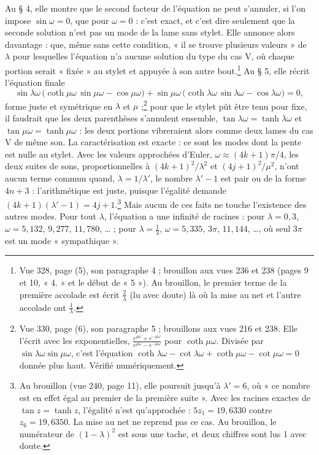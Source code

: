 \documentclass[11pt,a4paper]{article}
\begin{document}
Au § 4, elle montre que le second facteur de l'équation ne peut s'annuler, si l'on impose $\sin\omega=0$, que pour $\omega=0$ : c'est exact, et c'est dire seulement que la seconde solution n'est pas un mode de la lame sans stylet. Elle annonce alors davantage : que, même sans cette condition, « il se trouve plusieurs valeurs » de $\lambda$ pour lesquelles l'équation n'a aucune solution du type du cas V, où chaque portion serait « fixée » au stylet et appuyée à son autre bout.\footnote{Vue 328, page (5), son paragraphe 4 ; brouillon aux vues 236 et 238 (pages 9 et 10, « 4. » et le début de « 5 »). Au brouillon, le premier terme de la première accolade est écrit $\frac2\lambda$ (lu avec doute) là où la mise au net et l'autre accolade ont $\frac1\lambda$.} Au § 5, elle récrit l'équation finale
\[
\sin\lambda\omega\,\bigl(\coth\mu\omega\,\sin\mu\omega-\cos\mu\omega\bigr)+\sin\mu\omega\,\bigl(\coth\lambda\omega\,\sin\lambda\omega-\cos\lambda\omega\bigr)=0,
\]
forme juste et symétrique en $\lambda$ et $\mu$ ;\footnote{Vue 330, page (6), son paragraphe 5 ; brouillons aux vues 216 et 238. Elle l'écrit avec les exponentielles, $\frac{e^{\mu\omega}+e^{-\mu\omega}}{e^{\mu\omega}-e^{-\mu\omega}}$ pour $\coth\mu\omega$. Divisée par $\sin\lambda\omega\sin\mu\omega$, c'est l'équation $\coth\lambda\omega-\cot\lambda\omega+\coth\mu\omega-\cot\mu\omega=0$ donnée plus haut. Vérifié numériquement.} pour que le stylet pût être tenu pour fixe, il faudrait que les deux parenthèses s'annulent ensemble, $\tan\lambda\omega=\tanh\lambda\omega$ et $\tan\mu\omega=\tanh\mu\omega$ : les deux portions vibreraient alors comme deux lames du cas V de même son. La caractérisation est exacte : ce sont les modes dont la pente est nulle au stylet. Avec les valeurs approchées d'Euler, $\omega\approx(4k+1)\pi/4$, les deux suites de sons, proportionnelles à $(4k+1)^2/\lambda^2$ et $(4j+1)^2/\mu^2$, n'ont aucun terme commun quand, $\lambda=1/\lambda'$, le nombre $\lambda'-1$ est pair ou de la forme $4n+3$ : l'arithmétique est juste, puisque l'égalité demande $(4k+1)(\lambda'-1)=4j+1$.\footnote{Au brouillon (vue 240, page 11), elle poursuit jusqu'à $\lambda'=6$, où « ce nombre est en effet égal au premier de la première suite ». Avec les racines exactes de $\tan z=\tanh z$, l'égalité n'est qu'approchée : $5z_1=19{,}6330$ contre $z_6=19{,}6350$. La mise au net ne reprend pas ce cas. Au brouillon, le numérateur de $(1-\lambda)^2$ est sous une tache, et deux chiffres sont lus 1 avec doute.} Mais aucun de ces faits ne touche l'existence des autres modes. Pour tout $\lambda$, l'équation a une infinité de racines : pour $\lambda=0{,}3$, $\omega=5{,}132$, $9{,}277$, $11{,}780$, … ; pour $\lambda=\frac13$, $\omega=5{,}335$, $3\pi$, $11{,}144$, …, où seul $3\pi$ est un mode « sympathique ».
\end{document}
